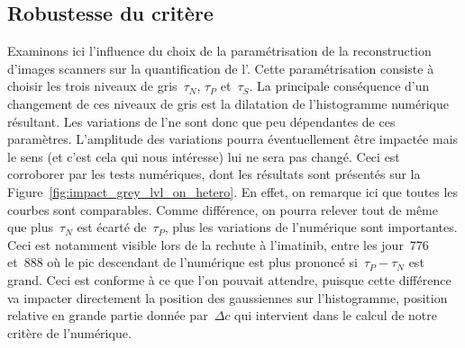 \documentclass[main.tex]{subfiles}
\begin{document}
\subsection{Robustesse du critère}
Examinons ici l'influence du choix de la paramétrisation de la reconstruction d'images scanners sur la quantification de l'\hetero. 
Cette paramétrisation consiste à choisir les trois niveaux de gris~$\tau_N$, $\tau_P$ et~$\tau_S$.  
La principale conséquence d'un changement de ces niveaux de gris est la dilatation de l'histogramme numérique résultant.  
Les variations de l'\hetero ne sont donc que peu dépendantes de ces paramètres. L'amplitude des variations pourra éventuellement être impactée mais le sens (et c'est cela qui nous intéresse) lui ne sera pas changé. Ceci est corroborer par les tests numériques, dont les résultats sont présentés sur  
la Figure~\ref{fig:impact_grey_lvl_on_hetero}. En effet, on remarque ici que toutes les courbes sont comparables. Comme différence, on pourra relever tout de même que plus~$\tau_N$ est écarté de~$\tau_P$, plus les variations de l'\hetero numérique sont importantes. Ceci est notamment visible lors de la rechute à l'imatinib, entre les jour~776 et~888 où le pic descendant de l'\hetero numérique est plus prononcé si~$\tau_P-\tau_N$ est grand. Ceci est conforme à ce que l'on pouvait attendre, puisque cette différence va impacter directement la position des gaussiennes sur l'histogramme, position relative en grande partie donnée par~$\Delta c$ qui intervient dans le calcul de notre critère de l'\hetero numérique. 

\end{document}
